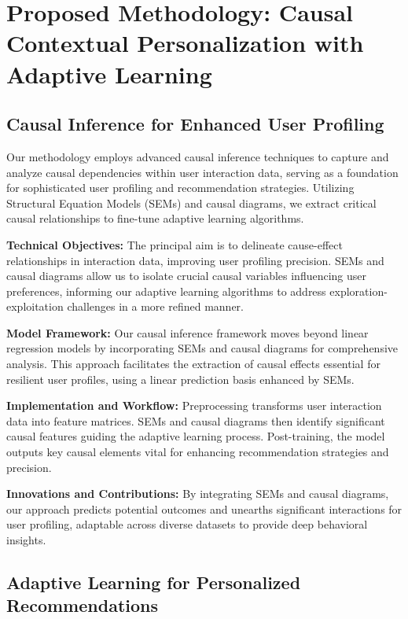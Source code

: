 \section{Proposed Methodology: Causal Contextual Personalization with Adaptive Learning}

\subsection{Causal Inference for Enhanced User Profiling}

Our methodology employs advanced causal inference techniques to capture and analyze causal dependencies within user interaction data, serving as a foundation for sophisticated user profiling and recommendation strategies. Utilizing Structural Equation Models (SEMs) and causal diagrams, we extract critical causal relationships to fine-tune adaptive learning algorithms.

\textbf{Technical Objectives:} The principal aim is to delineate cause-effect relationships in interaction data, improving user profiling precision. SEMs and causal diagrams allow us to isolate crucial causal variables influencing user preferences, informing our adaptive learning algorithms to address exploration-exploitation challenges in a more refined manner.

\textbf{Model Framework:} Our causal inference framework moves beyond linear regression models by incorporating SEMs and causal diagrams for comprehensive analysis. This approach facilitates the extraction of causal effects essential for resilient user profiles, using a linear prediction basis enhanced by SEMs.

\textbf{Implementation and Workflow:} Preprocessing transforms user interaction data into feature matrices. SEMs and causal diagrams then identify significant causal features guiding the adaptive learning process. Post-training, the model outputs key causal elements vital for enhancing recommendation strategies and precision.

\textbf{Innovations and Contributions:} By integrating SEMs and causal diagrams, our approach predicts potential outcomes and unearths significant interactions for user profiling, adaptable across diverse datasets to provide deep behavioral insights.

\subsection{Adaptive Learning for Personalized Recommendations}

